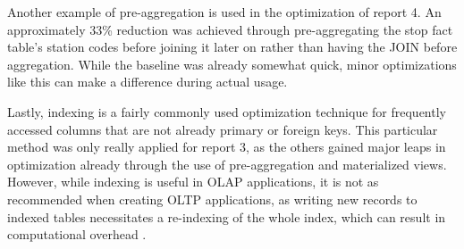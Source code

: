 Another example of pre-aggregation is used in the optimization of report 4. An approximately 33\% reduction was achieved through pre-aggregating the stop 
fact table's station codes before joining it later on rather than having the JOIN before aggregation. While the baseline was already somewhat quick, minor 
optimizations like this can make a difference during actual usage.

Lastly, indexing is a fairly commonly used optimization technique for frequently accessed columns that are not already primary or foreign keys. This particular 
method was only really applied for report 3, as the others gained major leaps in optimization already through the use of pre-aggregation and materialized views.
However, while indexing is useful in OLAP applications, it is not as recommended when creating OLTP applications, as writing new records to indexed tables 
necessitates a re-indexing of the whole index, which can result in computational overhead \cite{datacamp-optimization}.
